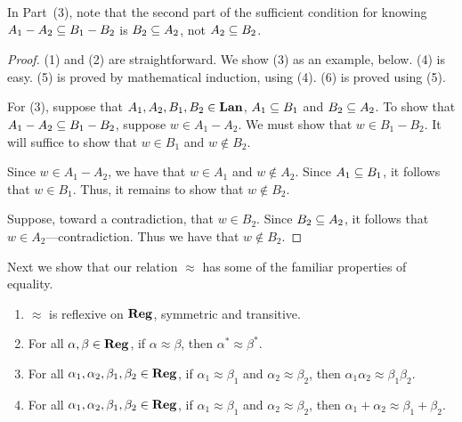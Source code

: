 In Part~(3), note that the second part of the sufficient condition for
knowing $A_1-A_2\subseteq B_1-B_2$ is $B_2\subseteq A_2$, not $A_2\subseteq B_2$.

\begin{proof}
(1) and (2) are straightforward.  We show (3) as an example, below.
(4) is easy.  (5) is proved by mathematical induction, using (4).  (6)
is proved using (5).

For (3), suppose that $A_1,A_2,B_1,B_2\in\mathbf{Lan}$, $A_1\subseteq B_1$ and
$B_2\subseteq A_2$.  To show that $A_1-A_2\subseteq B_1-B_2$, suppose $w\in
A_1-A_2$.  We must show that $w\in B_1-B_2$.  It will suffice to show
that $w\in B_1$ and $w\not\in B_2$.

Since $w\in A_1-A_2$, we have that $w\in A_1$ and
$w\not\in A_2$.  Since $A_1\subseteq B_1$, it follows that $w\in B_1$.
Thus, it remains to show that $w\not\in B_2$.

Suppose, toward a contradiction, that $w\in B_2$.  Since
$B_2\subseteq A_2$, it follows that $w\in A_2$---contradiction.  Thus we
have that $w\not\in B_2$.
\end{proof}

Next we show that our relation $\approx$ has some of the familiar
properties of equality.
%
%
%
%
%
%
\begin{proposition}
\label{RegEquivalence}
\begin{enumerate}[(1)]
\item $\approx$ is reflexive on $\mathbf{Reg}$, symmetric and transitive.

\item For all $\alpha,\beta\in\mathbf{Reg}$,
if $\alpha\approx\beta$, then $\alpha^*\approx{\beta}^*$.

\item For all $\alpha_1,\alpha_2,\beta_1,\beta_2\in\mathbf{Reg}$,
if $\alpha_1\approx\beta_1$ and $\alpha_2\approx\beta_2$,
then $\alpha_1\alpha_2\approx \beta_1\beta_2$.

\item For all $\alpha_1,\alpha_2,\beta_1,\beta_2\in\mathbf{Reg}$,
if $\alpha_1\approx\beta_1$ and $\alpha_2\approx\beta_2$,
then $\alpha_1+\alpha_2\approx \beta_1+\beta_2$.
\end{enumerate}
\end{proposition}

